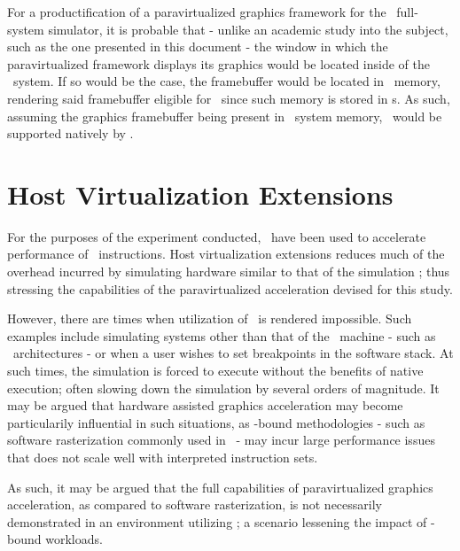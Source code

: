 For a productification of a paravirtualized graphics framework for the \dvttermsimics\ full-system simulator, it is probable that - unlike an academic study into the subject, such as the one presented in this document - the window in which the paravirtualized framework displays its graphics would be located inside of the \dvttermtarget\ system.
If so would be the case, the framebuffer would be located in \dvttermtarget\ memory, rendering said framebuffer eligible for \dvttermreverseexecution\ since such memory is stored in \dvttermcheckpoint s.
As such, assuming the graphics framebuffer being present in \dvttermtarget\ system memory, \dvttermreverseexecution\ would be supported natively by \dvttermsimics .

\section{Host Virtualization Extensions}
\label{sec:discussion_hostvirtualizationextensions}
For the purposes of the experiment conducted, \dvttermhostvirtualizationextensions\ have been used to accelerate performance of \dvttermxeightysix\ instructions.
Host virtualization extensions reduces much of the overhead incurred by simulating hardware similar to that of the simulation \dvttermhost ; thus stressing the capabilities of the paravirtualized acceleration devised for this study.

However, there are times when utilization of \dvttermhostvirtualizationextensions\ is rendered impossible.
Such examples include simulating systems other than that of the \dvttermhost\ machine - such as \dvttermarm\ architectures - or when a user wishes to set breakpoints in the software stack.
At such times, the simulation is forced to execute without the benefits of native execution; often slowing down the simulation by several orders of magnitude.
It may be argued that hardware assisted graphics acceleration may become particularily influential in such situations, as \dvttermcpu -bound methodologies - such as software rasterization commonly used in \dvttermsimics\ - may incur large performance issues that does not scale well with interpreted instruction sets.

As such, it may be argued that the full capabilities of paravirtualized graphics acceleration, as compared to software rasterization, is not necessarily demonstrated in an environment utilizing \dvttermhostvirtualizationextensions ; a scenario lessening the impact of \dvttermcpu -bound workloads.

